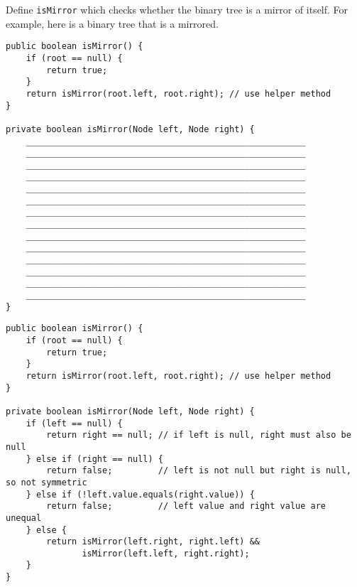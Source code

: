 \begin{blocksection}
\question Define \lstinline$isMirror$ which checks whether the binary tree is a mirror of itself.
For example, here is a binary tree that is a mirrored.

\begin{center}
\end{center}

\ifprintanswers\else
\begin{lstlisting}
public boolean isMirror() {
    if (root == null) {
        return true;
    }
    return isMirror(root.left, root.right); // use helper method
}

private boolean isMirror(Node left, Node right) {
    _______________________________________________________
    _______________________________________________________
    _______________________________________________________
    _______________________________________________________
    _______________________________________________________
    _______________________________________________________
    _______________________________________________________
    _______________________________________________________
    _______________________________________________________
    _______________________________________________________
    _______________________________________________________
    _______________________________________________________
    _______________________________________________________
    _______________________________________________________
}
\end{lstlisting}
\fi

\begin{solution}
\begin{lstlisting}
public boolean isMirror() {
    if (root == null) {
        return true;
    }
    return isMirror(root.left, root.right); // use helper method
}

private boolean isMirror(Node left, Node right) {
    if (left == null) {
        return right == null; // if left is null, right must also be null
    } else if (right == null) {
        return false;         // left is not null but right is null, so not symmetric
    } else if (!left.value.equals(right.value)) {
        return false;         // left value and right value are unequal
    } else {
        return isMirror(left.right, right.left) &&
               isMirror(left.left, right.right);
    }
}
\end{lstlisting}


\end{solution}
\end{blocksection}
